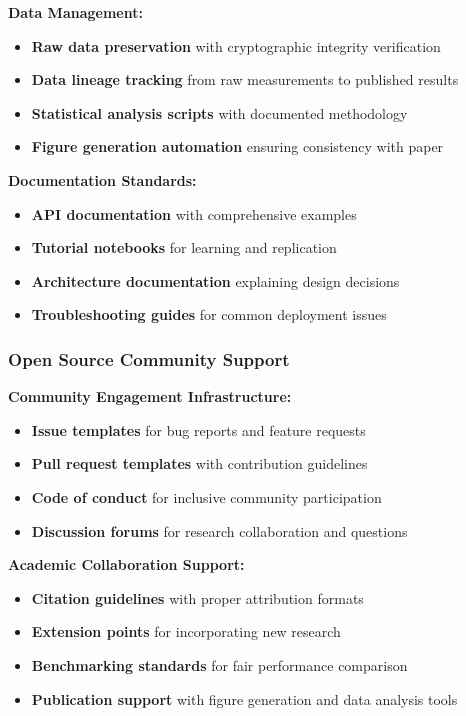 \documentclass[conference]{IEEEtran}
\begin{document}
\textbf{Data Management:}
\begin{itemize}
    \item \textbf{Raw data preservation} with cryptographic integrity verification
    \item \textbf{Data lineage tracking} from raw measurements to published results
    \item \textbf{Statistical analysis scripts} with documented methodology
    \item \textbf{Figure generation automation} ensuring consistency with paper
\end{itemize}

\textbf{Documentation Standards:}
\begin{itemize}
    \item \textbf{API documentation} with comprehensive examples
    \item \textbf{Tutorial notebooks} for learning and replication
    \item \textbf{Architecture documentation} explaining design decisions
    \item \textbf{Troubleshooting guides} for common deployment issues
\end{itemize}

\subsubsection{Open Source Community Support}

\textbf{Community Engagement Infrastructure:}
\begin{itemize}
    \item \textbf{Issue templates} for bug reports and feature requests
    \item \textbf{Pull request templates} with contribution guidelines
    \item \textbf{Code of conduct} for inclusive community participation
    \item \textbf{Discussion forums} for research collaboration and questions
\end{itemize}

\textbf{Academic Collaboration Support:}
\begin{itemize}
    \item \textbf{Citation guidelines} with proper attribution formats
    \item \textbf{Extension points} for incorporating new research
    \item \textbf{Benchmarking standards} for fair performance comparison
    \item \textbf{Publication support} with figure generation and data analysis tools
\end{itemize}
\end{document}
